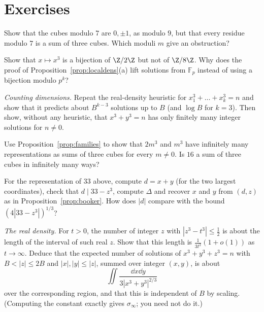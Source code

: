 \section{Exercises}

\begin{exercise}[$\star$]\label{ex:mod7}
Show that the cubes modulo $7$ are $0,\pm1$, as modulo $9$, but that every residue modulo $7$ is a sum of three cubes. Which moduli $m$ give an obstruction?
\end{exercise}

\begin{exercise}[$\star$]\label{ex:cubebij}
Show that $x\mapsto x^3$ is a bijection of $\Z/2\Z$ but not of $\Z/8\Z$. Why does the proof of Proposition~\ref{prop:localdens}(a) lift solutions from $\mathbb F_p$ instead of using a bijection modulo $p^k$?
\end{exercise}

\begin{exercise}[$\star\star$]\label{ex:dimcount}
\emph{Counting dimensions.} Repeat the real-density heuristic for $x_1^3+\dots+x_k^3=n$ and show that it predicts about $B^{k-3}$ solutions up to $B$ (and $\log B$ for $k=3$). Then show, without
any heuristic, that $x^3+y^3=n$ has only finitely many integer solutions for $n\ne0$.
\end{exercise}

\begin{exercise}[$\star$]\label{ex:families2}
Use Proposition~\ref{prop:families} to show that $2m^3$ and $m^3$ have infinitely many representations as sums of three cubes for every $m\ne0$. Is $16$ a sum of three cubes in infinitely many ways?
\end{exercise}

\begin{exercise}[$\star\star$]\label{ex:booker33}
For the representation of $33$ above, compute $d=x+y$ (for the two largest coordinates), check that $d\mid33-z^3$, compute $\Delta$ and recover $x$ and $y$ from $(d,z)$ as in Proposition~\ref{prop:booker}. How does $|d|$ compare
with the bound $(4|33-z^3|)^{1/3}$?
\end{exercise}

\begin{exercise}[$\star\star\star$]\label{ex:sigmainf}
\emph{The real density.} For $t>0$, the number of integer $z$ with $|z^3-t^3|\le\frac12$ is about the length of the interval of such real $z$. Show that this length is $\frac1{3t^2}(1+o(1))$ as $t\to\infty$.
Deduce that the expected number of solutions of $x^3+y^3+z^3=n$ with $B<|z|\le2B$ and $|x|,|y|\le|z|$, summed over integer $(x,y)$, is about
\[
\iint\frac{\dd x\dd y}{3|x^3+y^3|^{2/3}}
\]
over the corresponding region, and that this is independent of $B$ by scaling. (Computing the constant exactly gives $\sigma_\infty$; you need not do it.)
\end{exercise}

